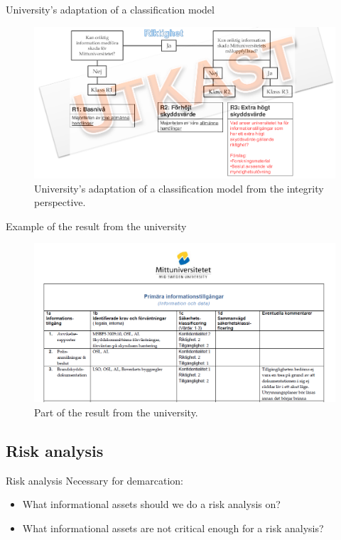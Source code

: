\documentclass{beamer}
\begin{document}
\begin{frame}{University's adaptation of a classification model}
  \begin{figure}
    \includegraphics[width=\textwidth]{miun-riktighet.png}
    \caption{University's adaptation of a classification model from the
      integrity perspective.}
  \end{figure}
\end{frame}

\begin{frame}{Example of the result from the university}
  \begin{figure}
    \includegraphics[width=\textwidth]{miun-klassresultat.png}
    \caption{Part of the result from the university.}
  \end{figure}
\end{frame}

\subsection{Risk analysis}

\begin{frame}{Risk analysis}
  Necessary for demarcation:
  \begin{itemize}
    \item What informational assets should we do a risk analysis on?
    \item What informational assets are not critical enough for a risk analysis?
  \end{itemize}
\end{frame}
\end{document}
